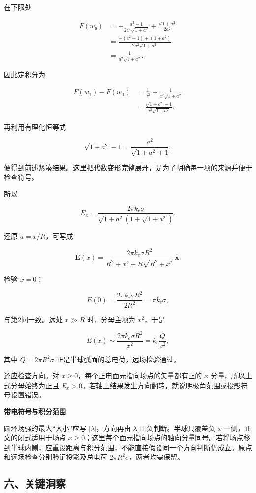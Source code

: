 \documentclass[12pt,a4paper,UTF8]{ctexart}
\begin{document}
在下限处

\[
\begin{aligned}
F(w_0)
&=-\frac{a^2-1}{2a^2\sqrt{1+a^2}}
+\frac{\sqrt{1+a^2}}{2a^2}\\
&=\frac{-(a^2-1)+(1+a^2)}
{2a^2\sqrt{1+a^2}}\\
&=\frac{1}{a^2\sqrt{1+a^2}}.
\end{aligned}
\]

因此定积分为

\[
\begin{aligned}
F(w_1)-F(w_0)
&=\frac{1}{a^2}
-\frac{1}{a^2\sqrt{1+a^2}}\\
&=\frac{\sqrt{1+a^2}-1}
{a^2\sqrt{1+a^2}}.
\end{aligned}
\]

再利用有理化恒等式

\[
\sqrt{1+a^2}-1
=\frac{a^2}{\sqrt{1+a^2}+1},
\]

便得到前述紧凑结果。这里把代数变形完整展开，是为了明确每一项的来源并便于检查符号。

所以

\[
E_x
=\frac{2\pi k_e\sigma}
{\sqrt{1+a^2}\left(1+\sqrt{1+a^2}\right)}.
\]

还原 \(a=x/R\)，可写成

\[
\boxed{
\bm E(x)=
\frac{2\pi k_e\sigma R^2}
{R^2+x^2+R\sqrt{R^2+x^2}}
\,\hat{\bm x}
}.
\]

检验 \(x=0\)：

\[
E(0)=\frac{2\pi k_e\sigma R^2}{2R^2}=\pi k_e\sigma,
\]

与第2问一致。远处 \(x\gg R\) 时，分母主项为 \(x^2\)，于是

\[
E(x)\sim\frac{2\pi k_e\sigma R^2}{x^2}
=k_e\frac{Q}{x^2},
\]

其中 \(Q=2\pi R^2\sigma\) 正是半球弧面的总电荷，远场检验通过。

还应检查方向。对 \(x\ge0\)，每个正电面元指向场点的矢量都有正的 \(x\)
分量，所以上式分母始终为正且
\(E_x>0\)。若轴上结果发生方向翻转，就说明极角范围或投影符号设置错误。

\textbf{带电符号与积分范围}

圆环场强的最大``大小''应写 \(|\lambda|\)，方向再由 \(\lambda\)
正负判断。半球只覆盖负 \(x\) 一侧，正文的闭式适用于场点
\(x\ge0\)；这里每个面元指向场点的轴向分量同号。若将场点移到半球内侧，应重设距离与积分范围，不能直接假设同一个方向判断仍成立。原点和远场检查分别验证投影及总电荷
\(2\pi R^2\sigma\)，两者均需保留。

\subsection{六、关键洞察}\label{ux516dux5173ux952eux6d1eux5bdf-5}
\end{document}
